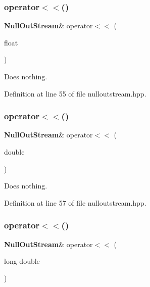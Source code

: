 \subsubsection{operator$<$$<$()\hspace{0.1cm}{\footnotesize\ttfamily [8/18]}}
{\footnotesize\ttfamily \textbf{ Null\+Out\+Stream}\& operator$<$$<$ (\begin{DoxyParamCaption}\item[{float}]{ }\end{DoxyParamCaption})\hspace{0.3cm}{\ttfamily [inline]}}



Does nothing. 



Definition at line 55 of file nulloutstream.\+hpp.

\mbox{\label{classmlpack_1_1util_1_1NullOutStream_ab3032651397a5ca2ab3a181a5c139f41}} 
\subsubsection{operator$<$$<$()\hspace{0.1cm}{\footnotesize\ttfamily [9/18]}}
{\footnotesize\ttfamily \textbf{ Null\+Out\+Stream}\& operator$<$$<$ (\begin{DoxyParamCaption}\item[{double}]{ }\end{DoxyParamCaption})\hspace{0.3cm}{\ttfamily [inline]}}



Does nothing. 



Definition at line 57 of file nulloutstream.\+hpp.

\mbox{\label{classmlpack_1_1util_1_1NullOutStream_a4527c7decea1d31ab0f4295a03b26401}} 
\subsubsection{operator$<$$<$()\hspace{0.1cm}{\footnotesize\ttfamily [10/18]}}
{\footnotesize\ttfamily \textbf{ Null\+Out\+Stream}\& operator$<$$<$ (\begin{DoxyParamCaption}\item[{long}]{double }\end{DoxyParamCaption})\hspace{0.3cm}{\ttfamily [inline]}}



